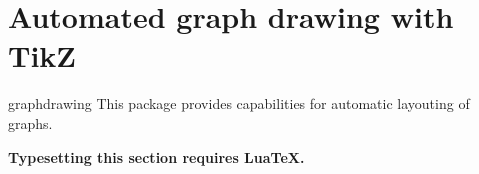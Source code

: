 %
%
%

\section{Automated graph drawing with TikZ}
{}
\label{section-library-graphdrawing}

\begin{tikzlibrary}{graphdrawing}
This package provides capabilities for automatic layouting of graphs.
\end{tikzlibrary}

\par

\par

{\bf Typesetting this section requires LuaTeX.}
